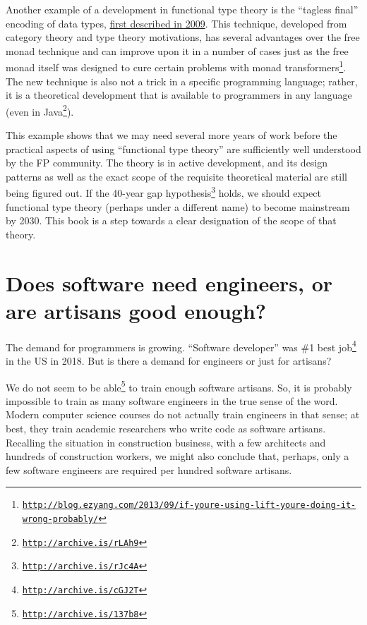 Another example of a development in functional type theory is the
 ``tagless final'' encoding of data types, \href{http://okmij.org/ftp/tagless-final/index.html}{first described in 2009}.
This technique, developed from category theory and type theory motivations,
has several advantages over the free monad technique and can improve
upon it in a number of cases \textemdash{} just as the free monad
itself was designed to cure certain problems with monad transformers\footnote{\texttt{\href{http://blog.ezyang.com/2013/09/if-youre-using-lift-youre-doing-it-wrong-probably/}{http://blog.ezyang.com/2013/09/if-youre-using-lift-youre-doing-it-wrong-probably/}}}.
The new technique is also not a trick in a specific programming language;
rather, it is a theoretical development that is available to programmers
in any language (even in Java\footnote{\texttt{\href{http://archive.is/rLAh9}{http://archive.is/rLAh9}}}).

This example shows that we may need several more years of work before
the practical aspects of using ``functional type theory'' are sufficiently
well understood by the FP community. The theory is in active development,
and its design patterns \textemdash{} as well as the exact scope of
the requisite theoretical material \textemdash{} are still being figured
out. If the 40-year gap hypothesis\footnote{\texttt{\href{http://archive.is/rJc4A}{http://archive.is/rJc4A}}}
holds, we should expect functional type theory (perhaps under a different
name) to become mainstream by 2030. This book is a step towards a
clear designation of the scope of that theory.

\section{Does software need engineers, or are artisans good enough? }

The demand for programmers is growing. ``Software developer'' was
\#1 best job\footnote{\texttt{\href{http://archive.is/cGJ2T}{http://archive.is/cGJ2T}}}
in the US in 2018. But is there a demand for engineers or just for
artisans?

We do not seem to be able\footnote{\texttt{\href{http://archive.is/137b8}{http://archive.is/137b8}}}
to train enough software artisans. So, it is probably impossible to
train as many software engineers in the true sense of the word. Modern
computer science courses do not actually train engineers in that sense;
at best, they train academic researchers who write code as software
artisans. Recalling the situation in construction business, with a
few architects and hundreds of construction workers, we might also
conclude that, perhaps, only a few software engineers are required
per hundred software artisans.

